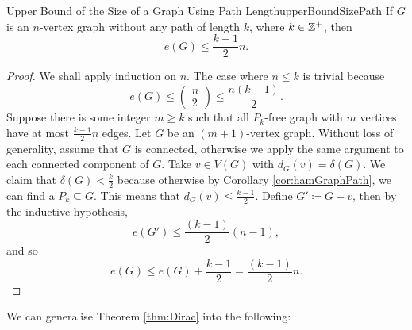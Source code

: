 \documentclass[math]{amznotes}
\theoremstyle{remark}
\begin{document}
\begin{corbox}{Upper Bound of the Size of a Graph Using Path Length}{upperBoundSizePath}
    If $G$ is an $n$-vertex graph without any path of length $k$, where $k \in \mathbb{Z}^+$, then 
    \begin{equation*}
        e(G) \leq \frac{k - 1}{2}n.
    \end{equation*}
    \tcblower
    \begin{proof}
        We shall apply induction on $n$. The case where $n \leq k$ is trivial because
        \begin{equation*}
            e(G) \leq \begin{pmatrix}
                n \\
                2
            \end{pmatrix} \leq \frac{n(k - 1)}{2}.
        \end{equation*}
        Suppose there is some integer $m \geq k$ such that all $P_k$-free graph with $m$ vertices have at most $\frac{k - 1}{2}n$ edges. Let $G$ be an $(m + 1)$-vertex graph. Without loss of generality, assume that $G$ is connected, otherwise we apply the same argument to each connected component of $G$. Take $v \in V(G)$ with $d_G(v) = \delta(G)$. We claim that $\delta(G) < \frac{k}{2}$ because otherwise by Corollary \ref{cor:hamGraphPath}, we can find a $P_k \subseteq G$. This means that $d_G(v) \leq \frac{k - 1}{2}$. Define $G' \coloneqq G - v$, then by the inductive hypothesis, 
        \begin{equation*}
            e(G') \leq \frac{(k - 1)}{2}(n - 1),
        \end{equation*}
        and so 
        \begin{equation*}
            e(G) \leq e(G) + \frac{k - 1}{2} = \frac{(k - 1)}{2}n.
        \end{equation*}
    \end{proof}
\end{corbox}
We can generalise Theorem \ref{thm:Dirac} into the following:
\end{document}

